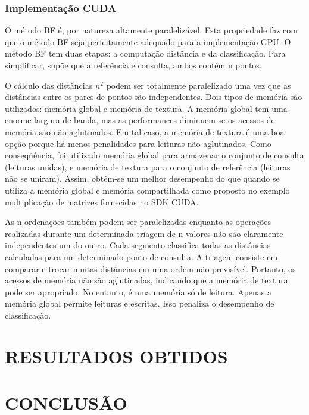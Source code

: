 \documentclass[letterpaper, 10 pt, conference]{ieeeconf}  %
\begin{document}
\subsubsection{Implementação CUDA}

O método BF é, por natureza altamente paralelizável. Esta propriedade faz com que o método BF seja perfeitamente adequado para a implementação GPU. O método BF tem duas etapas: a computação distância e da classificação. Para simplificar, supõe que a referência e consulta, ambos contêm n pontos. 

O cálculo das distâncias $n^2$ podem ser totalmente paralelizado uma vez que as distâncias entre os pares de pontos são independentes. Dois tipos de memória são utilizados: memória global e memória de textura. A memória global tem uma enorme largura de banda, mas as performances diminuem se os acessos de memória são não-aglutinados. Em tal caso, a memória de textura é uma boa opção porque há menos penalidades para leituras não-aglutinados. Como conseqüência, foi utilizado memória global para armazenar o conjunto de consulta (leituras unidas), e memória de textura para o conjunto de referência (leituras não se uniram). Assim, obtém-se um melhor desempenho do que quando se utiliza a memória global e memória compartilhada como proposto no exemplo multiplicação de matrizes fornecidas no SDK CUDA. 

As n ordenações também podem ser paralelizadas enquanto as operações realizadas durante um determinada triagem de n valores não são claramente independentes um do outro. Cada segmento classifica todas as distâncias calculadas para um determinado ponto de consulta. A triagem consiste em comparar e trocar muitas distâncias em uma ordem não-previsível. Portanto, os acessos de memória não são aglutinadas, indicando que a memória de textura pode ser apropriado. No entanto, é uma memória só de leitura. Apenas a memória global permite leituras e escritas. Isso penaliza o desempenho de classificação.

\section{RESULTADOS OBTIDOS}

\section*{CONCLUSÃO}
\end{document}

